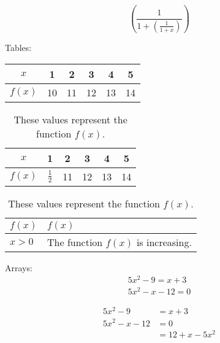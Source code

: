 \documentclass{article}
\begin{document}
$$\left(  \frac{1}{1 + \left( \frac{1}{1+x} \right)}  \right)$$

Tables:\\

\begin{tabular}{|c|c|c|c|c|c|}
  \hline
  $x$    & 1  & 2  & 3  & 4  & 5 \\ \hline
  $f(x)$ & 10 & 11 & 12 & 13 & 14 \\ \hline
\end{tabular}

\vspace{1cm}

\begin{table}[H]
  \centering
  \def\arraystretch{1.3}
  \begin{tabular}{|c|c|c|c|c|c|}
    \hline
    $x$    & 1  & 2  & 3  & 4  & 5 \\ \hline
    $f(x)$ & $\frac{1}{2}$ & 11 & 12 & 13 & 14 \\ \hline
  \end{tabular}
  \caption{These values represent the function $f(x)$.}
\end{table}

\begin{table}[H]
  \centering
  \def\arraystretch{1.3}
  \caption{These values represent the function $f(x)$.}
  \begin{tabular}{|l|p{2cm}|}
    \hline
    $f(x)$ & $f(x)$ \\ \hline
    $x>0$  & The function $f(x)$ is increasing. \\ \hline
  \end{tabular}
\end{table}

Arrays:
\begin{align}
	5x^2-9=x+3\\
	5x^2-x-12=0
\end{align}

\begin{align*}
	5x^2-9&=x+3\\
	5x^2-x-12&=0\\
	&=12+x-5x^2
\end{align*}
\end{document}
